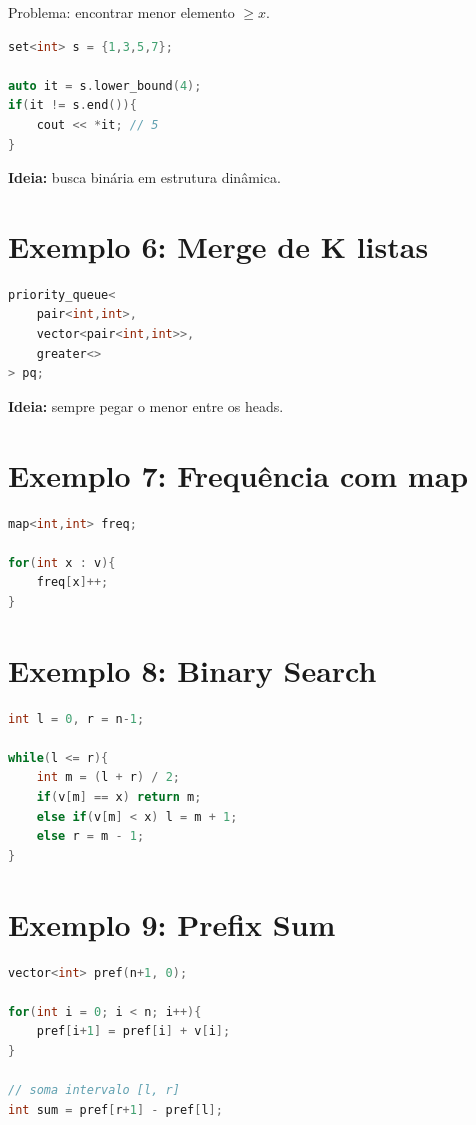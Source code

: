 \documentclass[11pt]{article}
\begin{document}
Problema: encontrar menor elemento $\geq x$.

\begin{lstlisting}[language=C++]
set<int> s = {1,3,5,7};

auto it = s.lower_bound(4);
if(it != s.end()){
    cout << *it; // 5
}
\end{lstlisting}

\textbf{Ideia:} busca binária em estrutura dinâmica.

\section{Exemplo 6: Merge de K listas}

\begin{lstlisting}[language=C++]
priority_queue<
    pair<int,int>,
    vector<pair<int,int>>,
    greater<>
> pq;


\end{lstlisting}

\textbf{Ideia:} sempre pegar o menor entre os heads.

\section{Exemplo 7: Frequência com map}

\begin{lstlisting}[language=C++]
map<int,int> freq;

for(int x : v){
    freq[x]++;
}
\end{lstlisting}

\section{Exemplo 8: Binary Search}

\begin{lstlisting}[language=C++]
int l = 0, r = n-1;

while(l <= r){
    int m = (l + r) / 2;
    if(v[m] == x) return m;
    else if(v[m] < x) l = m + 1;
    else r = m - 1;
}
\end{lstlisting}

\section{Exemplo 9: Prefix Sum}

\begin{lstlisting}[language=C++]
vector<int> pref(n+1, 0);

for(int i = 0; i < n; i++){
    pref[i+1] = pref[i] + v[i];
}

// soma intervalo [l, r]
int sum = pref[r+1] - pref[l];
\end{lstlisting}
\end{document}
